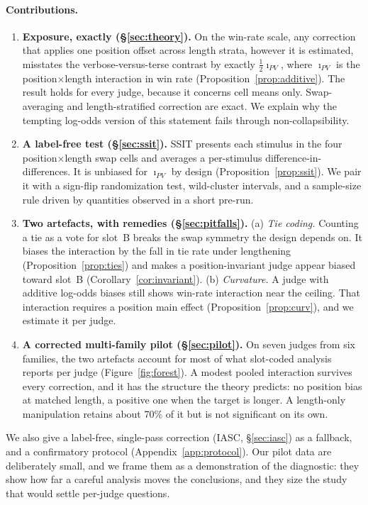 \documentclass[10pt]{article}
\theoremstyle{remark}
\newcommand{\iPV}{\imath_{PV}}
\begin{document}
\paragraph{Contributions.}
\begin{enumerate}[leftmargin=*,itemsep=2pt,topsep=2pt]
\item \textbf{Exposure, exactly (\S\ref{sec:theory}).} On the win-rate
  scale, any correction that applies one position offset across length
  strata, however it is estimated, misstates the verbose-versus-terse
  contrast by exactly $\tfrac12\iPV$, where $\iPV$ is the
  position$\times$length interaction in win rate
  (Proposition~\ref{prop:additive}). The result holds for every judge,
  because it concerns cell means only. Swap-averaging and
  length-stratified correction are exact. We explain why the tempting
  log-odds version of this statement fails through non-collapsibility.
\item \textbf{A label-free test (\S\ref{sec:ssit}).} SSIT presents each
  stimulus in the four position$\times$length swap cells and averages a
  per-stimulus difference-in-differences. It is unbiased for $\iPV$ by
  design (Proposition~\ref{prop:ssit}). We pair it with a sign-flip
  randomization test, wild-cluster intervals, and a sample-size rule
  driven by quantities observed in a short pre-run.
\item \textbf{Two artefacts, with remedies (\S\ref{sec:pitfalls}).} (a)
  \emph{Tie coding.} Counting a tie as a vote for slot~B breaks the swap
  symmetry the design depends on. It biases the interaction by the fall
  in tie rate under lengthening (Proposition~\ref{prop:ties}) and makes
  a position-invariant judge appear biased toward slot~B
  (Corollary~\ref{cor:invariant}). (b) \emph{Curvature.} A judge with
  additive log-odds biases still shows win-rate interaction near the
  ceiling. That interaction requires a position main effect
  (Proposition~\ref{prop:curv}), and we estimate it per judge.
\item \textbf{A corrected multi-family pilot (\S\ref{sec:pilot}).} On
  seven judges from six families, the two artefacts account for most of
  what slot-coded analysis reports per judge
  (Figure~\ref{fig:forest}). A modest pooled interaction survives every
  correction, and it has the structure the theory predicts: no position
  bias at matched length, a positive one when the target is longer. A
  length-only manipulation retains about 70\% of it but is not
  significant on its own.
\end{enumerate}
We also give a label-free, single-pass correction (IASC,
\S\ref{sec:iasc}) as a fallback, and a confirmatory protocol
(Appendix~\ref{app:protocol}). Our pilot data are deliberately small,
and we frame them as a demonstration of the diagnostic: they show how
far a careful analysis moves the conclusions, and they size the study
that would settle per-judge questions.
\end{document}

